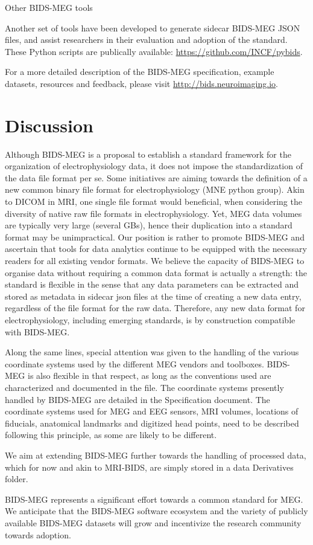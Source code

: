 Other BIDS-MEG tools

Another set of tools have been developed to generate sidecar BIDS-MEG JSON files, and assist researchers in their evaluation  and adoption of the standard. These Python scripts are publically available:  \url{https://github.com/INCF/pybids}.

For a more detailed description of the BIDS-MEG specification, example datasets, resources and feedback, please visit \url{http://bids.neuroimaging.io}.

\section{Discussion}
\label{sec:bids_discussion}
Although BIDS-MEG is a proposal to establish a standard framework for the organization of electrophysiology data, it does not impose the standardization of the data file format per se. Some initiatives are aiming towards the definition of a new common binary file format for electrophysiology (MNE python group). Akin to DICOM in MRI, one single file format would beneficial, when considering the diversity of native raw file formats in electrophysiology. Yet, MEG data volumes are typically very large (several GBs), hence their duplication into a standard format may be unimpractical. Our position is rather to promote BIDS-MEG and ascertain that tools for data analytics continue to be equipped with the necessary readers for all existing vendor formats. We believe the capacity of BIDS-MEG to organise data without requiring a common data format is actually a strength: the standard is flexible in the sense that any data parameters can be extracted and stored as metadata in sidecar json files at the time of creating a new data entry, regardless of the file format for the raw data. Therefore, any new data format for electrophysiology, including emerging standards, is by construction compatible with BIDS-MEG.

Along the same lines, special attention was given to the handling of the various  coordinate systems used by the different MEG vendors and toolboxes. BIDS-MEG is also flexible in that respect, as long as the conventions used are characterized and documented in the  file. The coordinate systems presently handled by BIDS-MEG are detailed in the Specification document. The coordinate systems used for MEG and EEG sensors, MRI volumes, locations of fiducials, anatomical landmarks and digitized head points, need to be described following this principle, as some are likely to be different.

We aim at extending BIDS-MEG further towards the handling of processed data, which for now and akin to MRI-BIDS, are simply stored in a data Derivatives folder.

BIDS-MEG represents a significant effort towards a common standard for MEG. We anticipate that the BIDS-MEG software ecosystem and the variety of publicly available BIDS-MEG datasets will grow and incentivize the research community towards adoption. 
